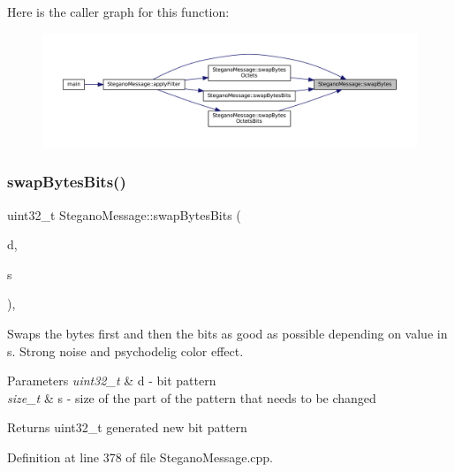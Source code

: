 Here is the caller graph for this function\+:
\nopagebreak
\begin{figure}[H]
\begin{center}
\leavevmode
\includegraphics[width=350pt]{classSteganoMessage_af80189e6fb64aa4ae6cc48f92eaec147_icgraph}
\end{center}
\end{figure}
\mbox{\label{classSteganoMessage_a67f4f4c91ecddb89368c4b9cc42ac07e}} 
\subsubsection{\texorpdfstring{swapBytesBits()}{swapBytesBits()}}
{\footnotesize\ttfamily uint32\+\_\+t Stegano\+Message\+::swap\+Bytes\+Bits (\begin{DoxyParamCaption}\item[{uint32\+\_\+t}]{d,  }\item[{size\+\_\+t}]{s }\end{DoxyParamCaption})\hspace{0.3cm}{\ttfamily [static]}, {\ttfamily [private]}}



Swaps the bytes first and then the bits as good as possible depending on value in s. Strong noise and psychodelig color effect. 


\begin{DoxyParams}{Parameters}
{\em uint32\+\_\+t} & d -\/ bit pattern \\
\hline
{\em size\+\_\+t} & s -\/ size of the part of the pattern that needs to be changed \\
\hline
\end{DoxyParams}
\begin{DoxyReturn}{Returns}
uint32\+\_\+t generated new bit pattern 
\end{DoxyReturn}


Definition at line 378 of file Stegano\+Message.\+cpp.

